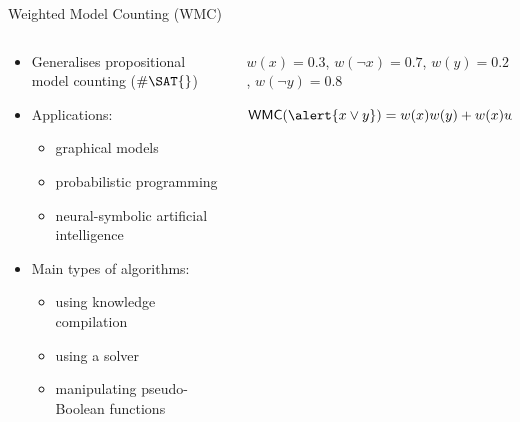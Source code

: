 \documentclass{beamer}
\begin{document}
\begin{frame}[fragile]{Weighted Model Counting (WMC)}
  \begin{columns}
    \begin{column}{0.5\textwidth}
      \begin{itemize}
      \item Generalises propositional model counting ($\#\SAT{}$)
      \item Applications:
        \begin{itemize}
        \item graphical models
        \item probabilistic programming
        \item neural-symbolic artificial intelligence
        \end{itemize}
      \item Main types of algorithms:
        \begin{itemize}
        \item using knowledge compilation
        \item using a \SAT{} solver
        \item manipulating pseudo-Boolean functions
        \end{itemize}
      \end{itemize}
    \end{column}
    \begin{column}{0.5\textwidth}
      \begin{example}
      $w(x) = 0.3$, $w(\neg x) = 0.7$, $w(y) = 0.2$, $w(\neg y) = 0.8$
      \vspace{1cm}

      $\mathsf{WMC}(\alert{x \lor y}) = w(x)w(y) + w(x)w(\neg y) + w(\neg x)w(y)
      = 0.44$
      \end{example}
    \end{column}
  \end{columns}
\end{frame}
\end{document}
